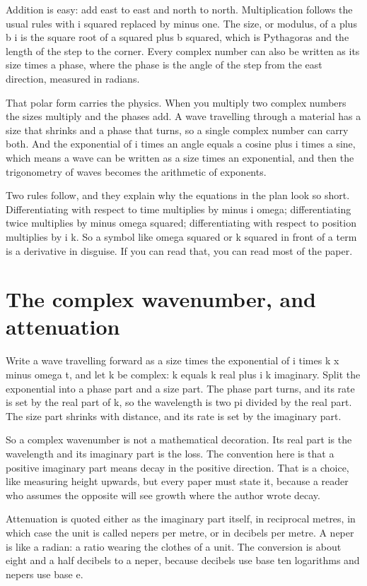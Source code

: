 \documentclass[11pt]{article}
\begin{document}
Addition is easy: add east to east and north to north. Multiplication follows the usual rules with i squared
replaced by minus one. The size, or modulus, of a plus b i is the square root of a squared plus b squared,
which is Pythagoras and the length of the step to the corner. Every complex number can also be written as its
size times a phase, where the phase is the angle of the step from the east direction, measured in radians.

That polar form carries the physics. When you multiply two complex numbers the sizes multiply and the phases
add. A wave travelling through a material has a size that shrinks and a phase that turns, so a single complex
number can carry both. And the exponential of i times an angle equals a cosine plus i times a sine, which
means a wave can be written as a size times an exponential, and then the trigonometry of waves becomes the
arithmetic of exponents.

Two rules follow, and they explain why the equations in the plan look so short. Differentiating with respect
to time multiplies by minus i omega; differentiating twice multiplies by minus omega squared; differentiating
with respect to position multiplies by i k. So a symbol like omega squared or k squared in front of a term is a
derivative in disguise. If you can read that, you can read most of the paper.

\section{The complex wavenumber, and attenuation}

Write a wave travelling forward as a size times the exponential of i times k x minus omega t, and let k be
complex: k equals k real plus i k imaginary. Split the exponential into a phase part and a size part. The
phase part turns, and its rate is set by the real part of k, so the wavelength is two pi divided by the real
part. The size part shrinks with distance, and its rate is set by the imaginary part.

So a complex wavenumber is not a mathematical decoration. Its real part is the wavelength and its imaginary
part is the loss. The convention here is that a positive imaginary part means decay in the positive
direction. That is a choice, like measuring height upwards, but every paper must state it, because a reader
who assumes the opposite will see growth where the author wrote decay.

Attenuation is quoted either as the imaginary part itself, in reciprocal metres, in which case the unit is
called nepers per metre, or in decibels per metre. A neper is like a radian: a ratio wearing the clothes of a
unit. The conversion is about eight and a half decibels to a neper, because decibels use base ten logarithms
and nepers use base e.
\end{document}
